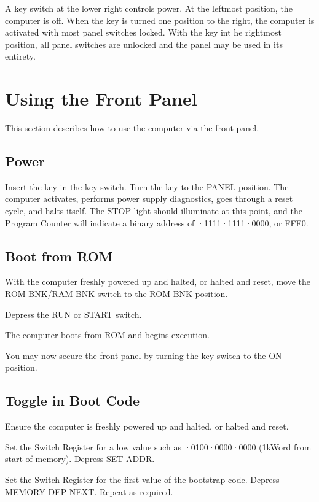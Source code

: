 \documentclass[11pt,a4paper,twocolumns]{article}
\newcommand{\lt}[1]{\textsf{#1}}
\newcommand{\sw}[1]{\textsf{#1}}
\begin{document}
A key switch at the lower right controls power. At the leftmost position, the
computer is off. When the key is turned one position to the right, the computer
is activated with most panel switches locked. With the key int he rightmost
position, all panel switches are unlocked and the panel may be used in its
entirety.

\section{Using the Front Panel}

This section describes how to use the computer via the front panel.

\subsection{Power}

Insert the key in the key switch. Turn the key to the \sw{PANEL}
position. The computer activates, performs power supply diagnostics,
goes through a reset cycle, and halts itself. The \lt{STOP} light
should illuminate at this point, and the Program Counter will indicate
a binary address of {·1111·1111·0000}, or {\sf FFF0}.

\subsection{Boot from ROM}

With the computer freshly powered up and halted, or halted and reset,
move the \sw{ROM BNK}/\sw{RAM BNK} switch to the \sw{ROM BNK}
position.

Depress the \sw{RUN} or \sw{START} switch.

The computer boots from ROM and begins execution.

You may now secure the front panel by turning the key switch to the
\sw{ON} position.

\subsection{Toggle in Boot Code}

Ensure the computer is freshly powered up and halted, or halted and reset.

Set the Switch Register for a low value such as {·0100·0000·0000} (1kWord from start of memory). Depress \sw{SET
  ADDR}.

Set the Switch Register for the first value of the bootstrap
code. Depress \sw{MEMORY DEP NEXT}. Repeat as required.
\end{document}
